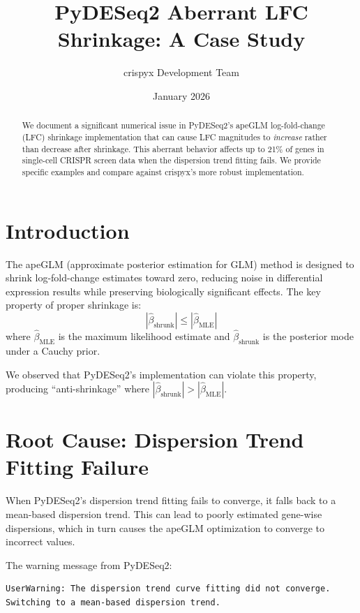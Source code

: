 \documentclass{article}
\title{PyDESeq2 Aberrant LFC Shrinkage: A Case Study}
\author{crispyx Development Team}
\date{January 2026}
\begin{document}
\maketitle

\begin{abstract}
We document a significant numerical issue in PyDESeq2's apeGLM log-fold-change (LFC) shrinkage implementation that can cause LFC magnitudes to \emph{increase} rather than decrease after shrinkage. This aberrant behavior affects up to 21\% of genes in single-cell CRISPR screen data when the dispersion trend fitting fails. We provide specific examples and compare against crispyx's more robust implementation.
\end{abstract}

\section{Introduction}

The apeGLM (approximate posterior estimation for GLM) method \cite{apeglm} is designed to shrink log-fold-change estimates toward zero, reducing noise in differential expression results while preserving biologically significant effects. The key property of proper shrinkage is:
\begin{equation}
    |\hat{\beta}_{\text{shrunk}}| \leq |\hat{\beta}_{\text{MLE}}|
\end{equation}
where $\hat{\beta}_{\text{MLE}}$ is the maximum likelihood estimate and $\hat{\beta}_{\text{shrunk}}$ is the posterior mode under a Cauchy prior.

We observed that PyDESeq2's implementation can violate this property, producing ``anti-shrinkage'' where $|\hat{\beta}_{\text{shrunk}}| > |\hat{\beta}_{\text{MLE}}|$.

\section{Root Cause: Dispersion Trend Fitting Failure}

When PyDESeq2's dispersion trend fitting fails to converge, it falls back to a mean-based dispersion trend. This can lead to poorly estimated gene-wise dispersions, which in turn causes the apeGLM optimization to converge to incorrect values.

The warning message from PyDESeq2:
\begin{verbatim}
UserWarning: The dispersion trend curve fitting did not converge. 
Switching to a mean-based dispersion trend.
\end{verbatim}
\end{document}
